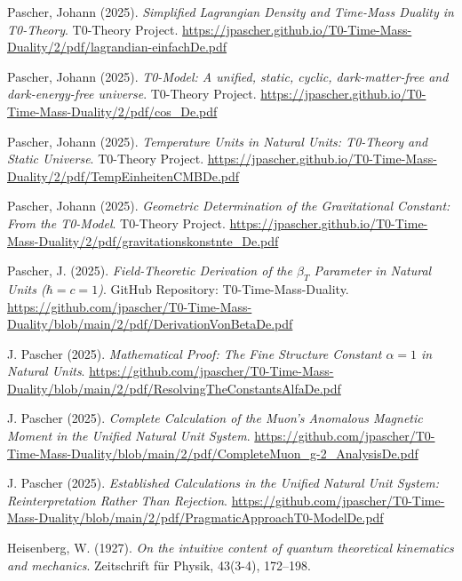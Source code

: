 \documentclass[12pt,a4paper]{article}
\theoremstyle{definition}
\begin{document}

\begin{thebibliography}{99}
	
	Pascher, Johann (2025). 
	\textit{Simplified Lagrangian Density and Time-Mass Duality in T0-Theory}. 
	T0-Theory Project. 
	\url{https://jpascher.github.io/T0-Time-Mass-Duality/2/pdf/lagrandian-einfachDe.pdf}
	
	Pascher, Johann (2025). 
	\textit{T0-Model: A unified, static, cyclic, dark-matter-free and dark-energy-free universe}. 
	T0-Theory Project. 
	\url{https://jpascher.github.io/T0-Time-Mass-Duality/2/pdf/cos_De.pdf}
	
	Pascher, Johann (2025). 
	\textit{Temperature Units in Natural Units: T0-Theory and Static Universe}. 
	T0-Theory Project. 
	\url{https://jpascher.github.io/T0-Time-Mass-Duality/2/pdf/TempEinheitenCMBDe.pdf}
	
	Pascher, Johann (2025). 
	\textit{Geometric Determination of the Gravitational Constant: From the T0-Model}. 
	T0-Theory Project. 
	\url{https://jpascher.github.io/T0-Time-Mass-Duality/2/pdf/gravitationskonstnte_De.pdf}
	

	
	Pascher, J. (2025). 
	\textit{Field-Theoretic Derivation of the $\beta_T$ Parameter in Natural Units ($\hbar = c = 1$)}. 
	GitHub Repository: T0-Time-Mass-Duality.
	\url{https://github.com/jpascher/T0-Time-Mass-Duality/blob/main/2/pdf/DerivationVonBetaDe.pdf}
	
	J. Pascher (2025).
	\textit{Mathematical Proof: The Fine Structure Constant $\alpha = 1$ in Natural Units}.
	\url{https://github.com/jpascher/T0-Time-Mass-Duality/blob/main/2/pdf/ResolvingTheConstantsAlfaDe.pdf}
	
	J. Pascher (2025).
	\textit{Complete Calculation of the Muon's Anomalous Magnetic Moment in the Unified Natural Unit System}.
	\url{https://github.com/jpascher/T0-Time-Mass-Duality/blob/main/2/pdf/CompleteMuon_g-2_AnalysisDe.pdf}
	
	J. Pascher (2025).
	\textit{Established Calculations in the Unified Natural Unit System: Reinterpretation Rather Than Rejection}.
	\url{https://github.com/jpascher/T0-Time-Mass-Duality/blob/main/2/pdf/PragmaticApproachT0-ModelDe.pdf}
	
	Heisenberg, W. (1927). 
	\textit{On the intuitive content of quantum theoretical kinematics and mechanics}. 
	Zeitschrift f\"ur Physik, 43(3-4), 172--198.
	

\end{thebibliography}
\end{document}
